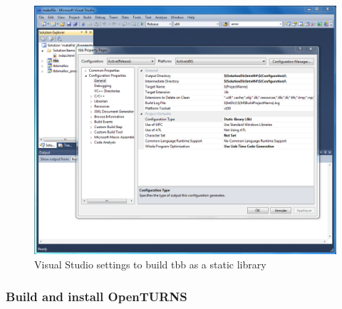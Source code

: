 \begin{figure}[htb]
\begin{center}
  \includegraphics[scale=0.5]{Figures/win_native/vs-tbb-static.png}
\end{center}
\caption{Visual Studio settings to build tbb as a static library}
\label{fig:vs-tbb-static}
\end{figure}

\subsubsection{Build and install OpenTURNS}

